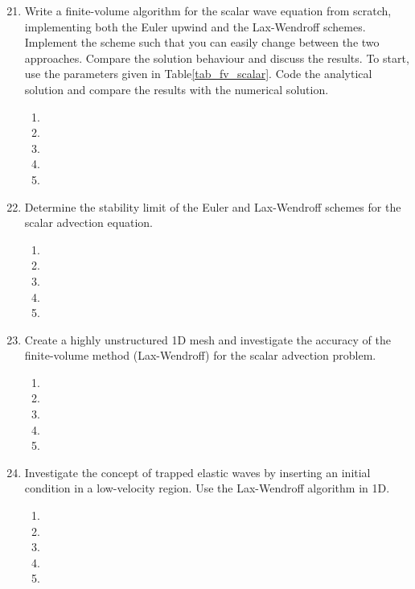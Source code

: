 \begin{enumerate}
\setcounter{enumi}{20}
\item
Write a finite-volume algorithm for the scalar wave equation from scratch, implementing both the Euler upwind and the Lax-Wendroff schemes. Implement the scheme such that you can easily change between the two approaches. Compare the solution behaviour and discuss the results. 
To start, use the parameters given in Table\ref{tab_fv_scalar}. Code the analytical solution and compare the results with the numerical solution. 
\begin{enumerate}
\item[]
\item[]
\item[] 
\item[]
\item[] 
\end{enumerate}
\item
Determine the stability limit of the Euler  and Lax-Wendroff  schemes for the scalar advection equation.
\begin{enumerate}
\item[]
\item[]
\item[] 
\item[]
\item[] 
\end{enumerate}
\item
Create a highly unstructured 1D mesh and investigate the accuracy of the finite-volume method (Lax-Wendroff) for the scalar advection problem.
\begin{enumerate}
\item[]
\item[]
\item[] 
\item[]
\item[] 
\end{enumerate}
\item
Investigate the concept of trapped elastic waves by inserting an initial condition in a low-velocity region. Use the Lax-Wendroff algorithm in 1D.  
\begin{enumerate}
\item[]
\item[]
\item[] 
\item[]
\item[] 
\end{enumerate}

\end{enumerate}
